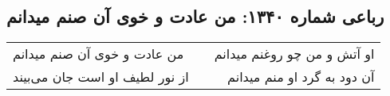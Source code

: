 \begin{center}
\section*{رباعی شماره ۱۳۴۰: من عادت و خوی آن صنم میدانم}
\label{sec:1340}
\begin{longtable}{l p{0.5cm} r}
من عادت و خوی آن صنم میدانم
&&
او آتش و من چو روغنم میدانم
\\
از نور لطیف او است جان می‌بیند
&&
آن دود به گرد او منم میدانم
\\
\end{longtable}
\end{center}
